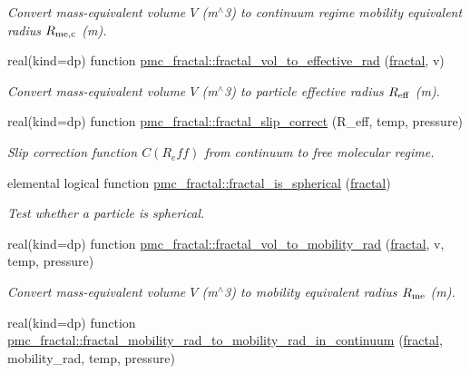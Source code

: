 \begin{DoxyCompactItemize}
\begin{DoxyCompactList}\small\item\em Convert mass-\/equivalent volume $V$ (m$^\wedge$3) to continuum regime mobility equivalent radius $R_{\rm me,c}$ (m). \end{DoxyCompactList}\item 
real(kind=dp) function \mbox{\hyperlink{namespacepmc__fractal_a28c425a25b9002db7a7dda6785da779e}{pmc\+\_\+fractal\+::fractal\+\_\+vol\+\_\+to\+\_\+effective\+\_\+rad}} (\mbox{\hyperlink{fractal_8_f90_a949ba7f6f3ce672ed686152acedb28bf}{fractal}}, v)
\begin{DoxyCompactList}\small\item\em Convert mass-\/equivalent volume $V$ (m$^\wedge$3) to particle effective radius $R_{\rm eff}$ (m). \end{DoxyCompactList}\item 
real(kind=dp) function \mbox{\hyperlink{namespacepmc__fractal_a34d28805768741cc91334a5613acaf2a}{pmc\+\_\+fractal\+::fractal\+\_\+slip\+\_\+correct}} (R\+\_\+eff, temp, pressure)
\begin{DoxyCompactList}\small\item\em Slip correction function $C(R_eff)$ from continuum to free molecular regime. \end{DoxyCompactList}\item 
elemental logical function \mbox{\hyperlink{namespacepmc__fractal_a4b772cc8c37c9773a9ff601e87dacd69}{pmc\+\_\+fractal\+::fractal\+\_\+is\+\_\+spherical}} (\mbox{\hyperlink{fractal_8_f90_a949ba7f6f3ce672ed686152acedb28bf}{fractal}})
\begin{DoxyCompactList}\small\item\em Test whether a particle is spherical. \end{DoxyCompactList}\item 
real(kind=dp) function \mbox{\hyperlink{namespacepmc__fractal_a510e73608db705ea8d74c854dcbbd736}{pmc\+\_\+fractal\+::fractal\+\_\+vol\+\_\+to\+\_\+mobility\+\_\+rad}} (\mbox{\hyperlink{fractal_8_f90_a949ba7f6f3ce672ed686152acedb28bf}{fractal}}, v, temp, pressure)
\begin{DoxyCompactList}\small\item\em Convert mass-\/equivalent volume $V$ (m$^\wedge$3) to mobility equivalent radius $R_{\rm me}$ (m). \end{DoxyCompactList}\item 
real(kind=dp) function \mbox{\hyperlink{namespacepmc__fractal_a7d5c0046bbe4c5d6c171d9dd287b73ca}{pmc\+\_\+fractal\+::fractal\+\_\+mobility\+\_\+rad\+\_\+to\+\_\+mobility\+\_\+rad\+\_\+in\+\_\+continuum}} (\mbox{\hyperlink{fractal_8_f90_a949ba7f6f3ce672ed686152acedb28bf}{fractal}}, mobility\+\_\+rad, temp, pressure)

\end{DoxyCompactItemize}
